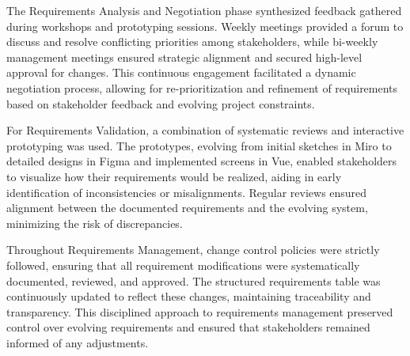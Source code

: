 The Requirements Analysis and Negotiation phase synthesized feedback gathered during workshops and prototyping sessions.
Weekly meetings provided a forum to discuss and resolve conflicting priorities among stakeholders, while bi-weekly
management meetings ensured strategic alignment and secured high-level approval for changes. This continuous engagement
facilitated a dynamic negotiation process, allowing for re-prioritization and refinement of requirements based on
stakeholder feedback and evolving project constraints.

For Requirements Validation, a combination of systematic reviews and interactive prototyping was used. The prototypes,
evolving from initial sketches in Miro to detailed designs in Figma and implemented screens in Vue, enabled stakeholders
to visualize how their requirements would be realized, aiding in early identification of inconsistencies or
misalignments. Regular reviews ensured alignment between the documented requirements and the evolving system, minimizing
the risk of discrepancies.

Throughout Requirements Management, change control policies were strictly followed, ensuring that all requirement
modifications were systematically documented, reviewed, and approved. The structured requirements table was continuously
updated to reflect these changes, maintaining traceability and transparency. This disciplined approach to requirements
management preserved control over evolving requirements and ensured that stakeholders remained informed of any
adjustments.
